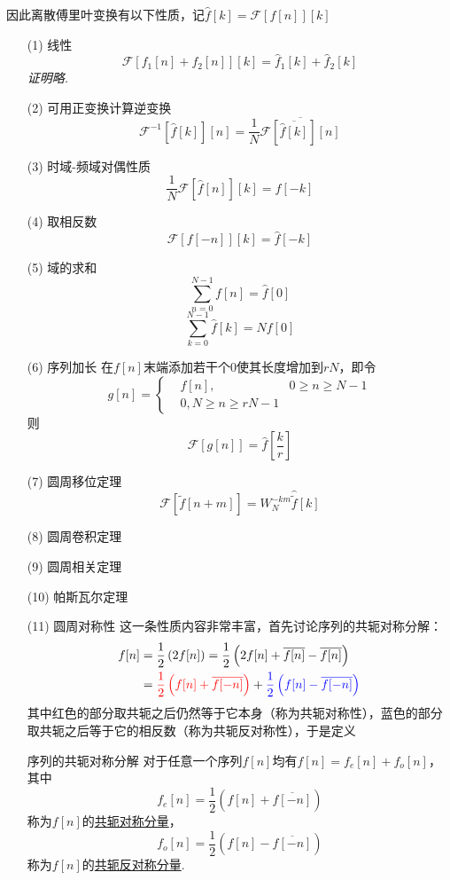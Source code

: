 因此离散傅里叶变换有以下性质，记\(\hat{f}[k]=\mathcal{F}[f[n]][k]\)
\begin{itemize}
    \item [(1)] 线性
    \[\mathcal{F}[f_1[n]+f_2[n]][k]=\hat{f}_1[k]+\hat{f}_2[k]\]
    \textit{
        证明略.
    }
    \item [(2)] 可用正变换计算逆变换
    \[\mathcal{F}^{-1}\left[\hat{f}[k]\right][n] = \frac{1}{N}\overline{\mathcal{F}\left[\overline{\hat{f}[k]}\right][n]}\]
    \item [(3)] 时域-频域对偶性质
    \[\frac{1}{N}\mathcal{F}\left[\hat{f}[n]\right][k]=f[-k]\]
    \item [(4)] 取相反数
    \[\mathcal{F}[f[-n]][k]=\hat{f}[-k]\]
    \item [(5)] 域的求和
    \[\sum_{n=0}^{N-1}f[n]=\hat{f}[0]\]
    \[\sum_{k=0}^{N-1}\hat{f}[k]=Nf[0]\]
    \item [(6)] 序列加长
    在\(f[n]\)末端添加若干个\(0\)使其长度增加到\(rN\)，即令
    \[g[n]=\left\{\begin{aligned}& f[n], & 0 \geq n \geq N-1 \\ & 0, N \geq n \geq rN-1 \end{aligned}\right.\]
    则
    \[\mathcal{F}[g[n]]=\hat{f}\left[\frac{k}{r}\right]\]
    \item [(7)] 圆周移位定理
    \[\mathcal{F}\left[\tilde{f}[n+m]\right]=W_N^{-km}\hat{\tilde{f}}[k]\]
    \item [(8)] 圆周卷积定理
    \item [(9)] 圆周相关定理
    \item [(10)] 帕斯瓦尔定理
    \item [(11)] 圆周对称性
    \newline
    这一条性质内容非常丰富，首先讨论序列的共轭对称分解：
    \begin{align*}
        f[n] & =\frac{1}{2}\left(2f[n]\right)=\frac{1}{2}\left(2f[n]+\overline{f[n]}-\overline{f[n]}\right) \\
        &= {\color{red}\frac{1}{2}\left(f[n]+\overline{f[-n]}\right)}+{\color{blue}\frac{1}{2}\left(f[n]-\overline{f[-n]}\right)}
    \end{align*}
    其中红色的部分取共轭之后仍然等于它本身（称为共轭对称性），蓝色的部分取共轭之后等于它的相反数（称为共轭反对称性），于是定义
    \begin{definition}{序列的共轭对称分解}
        对于任意一个序列\(f[n]\)均有\(f[n]=f_e[n]+f_o[n]\)，其中
        \[f_e[n]=\frac{1}{2}\left(f[n]+\overline{f[-n]}\right)\]
        称为\(f[n]\)的\uline{共轭对称分量}，
        \[f_o[n]=\frac{1}{2}\left(f[n]-\overline{f[-n]}\right)\]
        称为\(f[n]\)的\uline{共轭反对称分量}.
    \end{definition}
\end{itemize}

